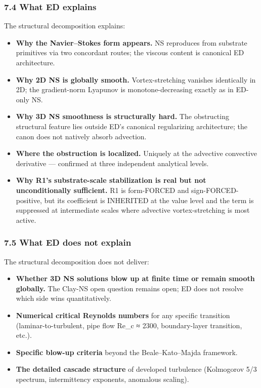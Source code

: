 \documentclass[
]{article}
\providecommand{\tightlist}{%
  \setlength{\itemsep}{0pt}\setlength{\parskip}{0pt}}
\begin{document}
\subsubsection{7.4 What ED explains}\label{what-ed-explains}

The structural decomposition explains:

\begin{itemize}
\tightlist
\item
  \textbf{Why the Navier--Stokes form appears.} NS reproduces from
  substrate primitives via two concordant routes; the viscous content is
  canonical ED architecture.
\item
  \textbf{Why 2D NS is globally smooth.} Vortex-stretching vanishes
  identically in 2D; the gradient-norm Lyapunov is monotone-decreasing
  exactly as in ED-only NS.
\item
  \textbf{Why 3D NS smoothness is structurally hard.} The obstructing
  structural feature lies outside ED's canonical regularizing
  architecture; the canon does not natively absorb advection.
\item
  \textbf{Where the obstruction is localized.} Uniquely at the advective
  convective derivative --- confirmed at three independent analytical
  levels.
\item
  \textbf{Why R1's substrate-scale stabilization is real but not
  unconditionally sufficient.} R1 is form-FORCED and
  sign-FORCED-positive, but its coefficient is INHERITED at the value
  level and the term is suppressed at intermediate scales where
  advective vortex-stretching is most active.
\end{itemize}

\subsubsection{7.5 What ED does not
explain}\label{what-ed-does-not-explain}

The structural decomposition does not deliver:

\begin{itemize}
\tightlist
\item
  \textbf{Whether 3D NS solutions blow up at finite time or remain
  smooth globally.} The Clay-NS open question remains open; ED does not
  resolve which side wins quantitatively.
\item
  \textbf{Numerical critical Reynolds numbers} for any specific
  transition (laminar-to-turbulent, pipe flow Re\_c ≈ 2300,
  boundary-layer transition, etc.).
\item
  \textbf{Specific blow-up criteria} beyond the Beale--Kato--Majda
  framework.
\item
  \textbf{The detailed cascade structure} of developed turbulence
  (Kolmogorov 5/3 spectrum, intermittency exponents, anomalous scaling).
\end{itemize}
\end{document}
